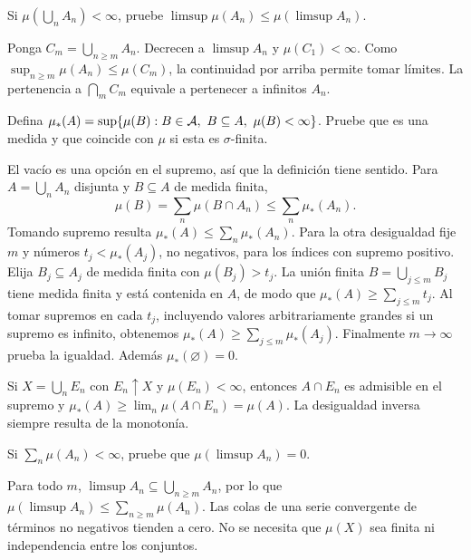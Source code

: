 \begin{ejercicio}\label{ej:v2-l02-5}
Si $\mu(\bigcup_nA_n)<\infty$, pruebe $\limsup\mu(A_n)\le\mu(\limsup A_n)$.
\end{ejercicio}
\begin{solucion}
Ponga $C_m=\bigcup_{n\ge m}A_n$. Decrecen a $\limsup A_n$ y $\mu(C_1)<\infty$. Como $\sup_{n\ge m}\mu(A_n)\le\mu(C_m)$, la continuidad por arriba permite tomar límites. La pertenencia a $\bigcap_mC_m$ equivale a pertenecer a infinitos $A_n$.
\end{solucion}

\begin{ejercicio}\label{ej:v2-l02-6}
Defina $\mu_*(A)=\sup\{\mu(B):B\in\Acal,\ B\subseteq A,\ \mu(B)<\infty\}$. Pruebe que es una medida y que coincide con $\mu$ si esta es $\sigma$-finita.
\end{ejercicio}
\begin{solucion}
El vacío es una opción en el supremo, así que la definición tiene sentido. Para $A=\bigcup_nA_n$ disjunta y $B\subseteq A$ de medida finita,
\[\mu(B)=\sum_n\mu(B\cap A_n)\le\sum_n\mu_*(A_n).\]
Tomando supremo resulta $\mu_*(A)\le\sum_n\mu_*(A_n)$. Para la otra desigualdad fije $m$ y números $t_j<\mu_*(A_j)$, no negativos, para los índices con supremo positivo. Elija $B_j\subseteq A_j$ de medida finita con $\mu(B_j)>t_j$. La unión finita $B=\bigcup_{j\le m}B_j$ tiene medida finita y está contenida en $A$, de modo que $\mu_*(A)\ge\sum_{j\le m}t_j$. Al tomar supremos en cada $t_j$, incluyendo valores arbitrariamente grandes si un supremo es infinito, obtenemos $\mu_*(A)\ge\sum_{j\le m}\mu_*(A_j)$. Finalmente $m\to\infty$ prueba la igualdad. Además $\mu_*(\varnothing)=0$.

Si $X=\bigcup_nE_n$ con $E_n\uparrow X$ y $\mu(E_n)<\infty$, entonces $A\cap E_n$ es admisible en el supremo y $\mu_*(A)\ge\lim_n\mu(A\cap E_n)=\mu(A)$. La desigualdad inversa siempre resulta de la monotonía.
\end{solucion}

\begin{ejercicio}\label{ej:v2-l02-7}
Si $\sum_n\mu(A_n)<\infty$, pruebe que $\mu(\limsup A_n)=0$.
\end{ejercicio}
\begin{solucion}
Para todo $m$, $\limsup A_n\subseteq\bigcup_{n\ge m}A_n$, por lo que $\mu(\limsup A_n)\le\sum_{n\ge m}\mu(A_n)$. Las colas de una serie convergente de términos no negativos tienden a cero. No se necesita que $\mu(X)$ sea finita ni independencia entre los conjuntos.
\end{solucion}

